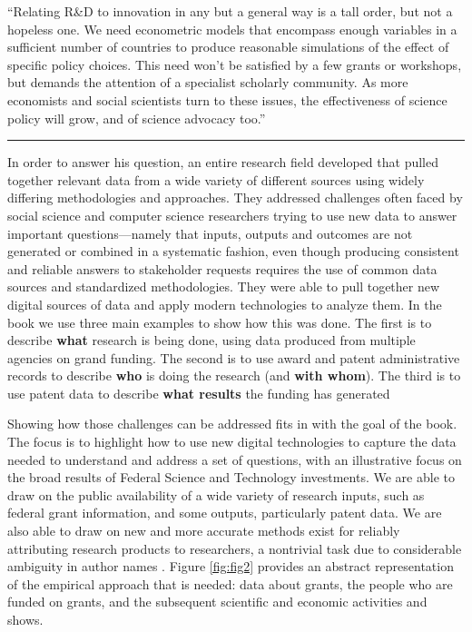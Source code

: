 \documentclass[]{krantz}
\begin{document}
``Relating R\&D to innovation in any but a general way is a tall order,
but not a hopeless one. We need econometric models that encompass enough
variables in a sufficient number of countries to produce reasonable
simulations of the effect of specific policy choices. This need won't be
satisfied by a few grants or workshops, but demands the attention of a
specialist scholarly community. As more economists and social scientists
turn to these issues, the effectiveness of science policy will grow, and
of science advocacy too.''

\begin{center}\rule{0.5\linewidth}{\linethickness}\end{center}

In order to answer his question, an entire research field developed that
pulled together relevant data from a wide variety of different sources
using widely differing methodologies and approaches. They addressed
challenges often faced by social science and computer science
researchers trying to use new data to answer important
questions---namely that inputs, outputs and outcomes are not generated
or combined in a systematic fashion, even though producing consistent
and reliable answers to stakeholder requests requires the use of common
data sources and standardized methodologies. They were able to pull
together new digital sources of data and apply modern technologies to
analyze them. In the book we use three main examples to show how this
was done. The first is to describe \textbf{what} research is being done,
using data produced from multiple agencies on grand funding. The second
is to use award and patent administrative records to describe
\textbf{who} is doing the research (and \textbf{with whom}). The third
is to use patent data to describe \textbf{what results} the funding has
generated \citep[\citet{Lane2018}]{weinberg2014science}

Showing how those challenges can be addressed fits in with the goal of
the book. The focus is to highlight how to use new digital technologies
to capture the data needed to understand and address a set of questions,
with an illustrative focus on the broad results of Federal Science and
Technology investments. We are able to draw on the public availability
of a wide variety of research inputs, such as federal grant information,
and some outputs, particularly patent data. We are also able to draw on
new and more accurate methods exist for reliably attributing research
products to researchers, a nontrivial task due to considerable ambiguity
in author names \citep[\citet{smalheiser2009author},
\citet{li2014disambiguation}, \citet{kim2016inventor}]{han2004two}.
Figure \ref{fig:fig2} provides an abstract representation of the
empirical approach that is needed: data about grants, the people who are
funded on grants, and the subsequent scientific and economic activities
and shows.
\end{document}
